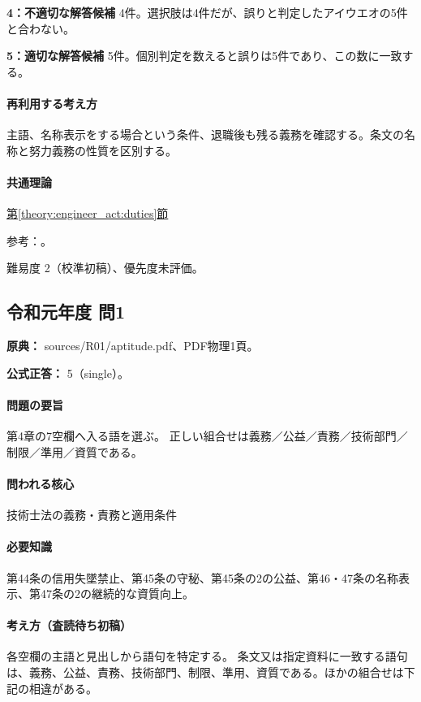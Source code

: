 \noindent\textbf{4：不適切な解答候補} 4件。選択肢は4件だが、誤りと判定したアイウエオの5件と合わない。\par

\noindent\textbf{5：適切な解答候補} 5件。個別判定を数えると誤りは5件であり、この数に一致する。\par

\paragraph{再利用する考え方} 主語、名称表示をする場合という条件、退職後も残る義務を確認する。条文の名称と努力義務の性質を区別する。

\paragraph{共通理論} \hyperref[theory:engineer_act:duties]{第\ref*{theory:engineer_act:duties}節}

\par 参考：\cite{engineer_act_current}。

\par 難易度 2（校準初稿）、優先度未評価。

\subsection{令和元年度 問1}
\label{q:r01-reg-apt-01}

\noindent\textbf{原典：} sources/R01/aptitude.pdf、PDF物理1頁。

\textbf{公式正答：} 5（single）。

\paragraph{問題の要旨} 第4章の7空欄へ入る語を選ぶ。 正しい組合せは義務／公益／責務／技術部門／制限／準用／資質である。

\paragraph{問われる核心} 技術士法の義務・責務と適用条件

\paragraph{必要知識} 第44条の信用失墜禁止、第45条の守秘、第45条の2の公益、第46・47条の名称表示、第47条の2の継続的な資質向上。

\paragraph{考え方（査読待ち初稿）} 各空欄の主語と見出しから語句を特定する。 条文又は指定資料に一致する語句は、義務、公益、責務、技術部門、制限、準用、資質である。ほかの組合せは下記の相違がある。

